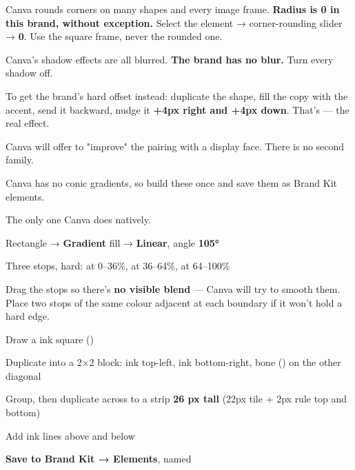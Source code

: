 \documentclass[fontpath=fonts/,logopath=logo/]{riposte-doc}
\begin{document}



Canva rounds corners on many shapes and every image frame. \textbf{Radius is 0 in this brand, without exception.} Select the element → corner-rounding slider → \textbf{0}. Use the square frame, never the rounded one.



Canva's shadow effects are all blurred. \textbf{The brand has no blur.} Turn every shadow off.

To get the brand's hard offset instead: duplicate the shape, fill the copy with the accent, send it backward, nudge it \textbf{+4px right and +4px down}. That's  — the real effect.



Canva will offer to "improve" the pairing with a display face. There is no second family.



Canva has no conic gradients, so build these once and save them as Brand Kit elements.



The only one Canva does natively.

\begin{ripnumbers}
\item Rectangle → \textbf{Gradient} fill → \textbf{Linear}, angle \textbf{105°}
\item Three stops, hard:  at 0–36\%,  at 36–64\%,  at 64–100\%
\item Drag the stops so there's \textbf{no visible blend} — Canva will try to smooth them. Place two stops of the same colour adjacent at each boundary if it won't hold a hard edge.
\end{ripnumbers}



\begin{ripnumbers}
\item Draw a  ink square ()
\item Duplicate into a 2×2 block: ink top-left, ink bottom-right, bone () on the other diagonal
\item Group, then duplicate across to a strip \textbf{26 px tall} (22px tile + 2px rule top and bottom)
\item Add \ripmono{2px} ink lines above and below
\item \textbf{Save to Brand Kit → Elements}, named 
\end{ripnumbers}
\end{document}
